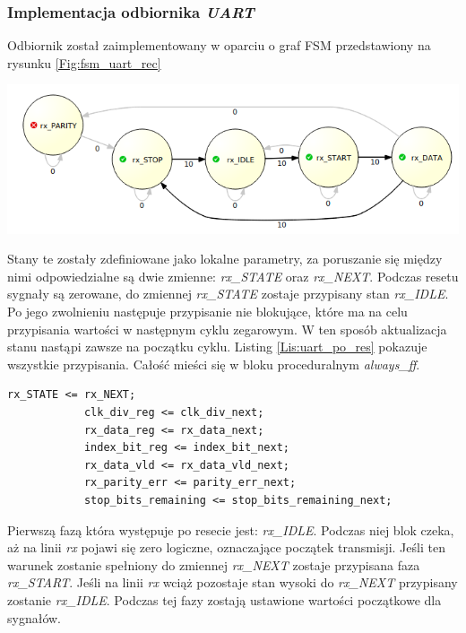 \documentclass[11pt,a4paper]{article}
\begin{document}
	\subsubsection{Implementacja odbiornika \textit{UART}}
	Odbiornik został zaimplementowany w oparciu o graf FSM przedstawiony na rysunku \ref{Fig:fsm_uart_rec} \\
			\begin{minipage}[c]{\textwidth}

					\includegraphics[width=\textwidth]{./rysunki/uart_fsm_rec.png}
			\end{minipage} 
			Stany te zostały zdefiniowane jako lokalne parametry, za poruszanie się między nimi odpowiedzialne są dwie zmienne: \textit{rx\_STATE} oraz \textit{rx\_NEXT}. Podczas resetu sygnały są zerowane, do zmiennej \textit{rx\_STATE} zostaje przypisany stan \textit{rx\_IDLE}. Po jego zwolnieniu następuje przypisanie nie blokujące, które ma na celu przypisania wartości w następnym cyklu zegarowym. W ten sposób aktualizacja stanu nastąpi zawsze na początku cyklu. Listing \ref{Lis:uart_po_res} pokazuje wszystkie przypisania. Całość mieści się w bloku proceduralnym \textit{always\_ff}.\\
\begin{minipage}{\textwidth}
\begin{scriptsize}
\begin{lstlisting}[label=Lis:uart_po_res,caption=Odbiornik \textit{UART} po resecie]
			rx_STATE <= rx_NEXT;
			clk_div_reg <= clk_div_next;
			rx_data_reg <= rx_data_next;
			index_bit_reg <= index_bit_next;
			rx_data_vld <= rx_data_vld_next;
			rx_parity_err <= parity_err_next;
			stop_bits_remaining <= stop_bits_remaining_next;
\end{lstlisting}
\end{scriptsize}
\end{minipage}	
Pierwszą fazą która występuje po resecie jest: \textit{rx\_IDLE}. Podczas niej blok czeka, aż na linii \textit{rx} pojawi się zero logiczne, oznaczające początek transmisji. Jeśli ten warunek zostanie spełniony do zmiennej \textit{rx\_NEXT} zostaje przypisana faza \textit{rx\_START}. Jeśli na linii \textit{rx} wciąż pozostaje stan wysoki do \textit{rx\_NEXT} przypisany zostanie \textit{rx\_IDLE}. Podczas tej fazy zostają ustawione wartości początkowe dla sygnałów.\\
\end{document}
